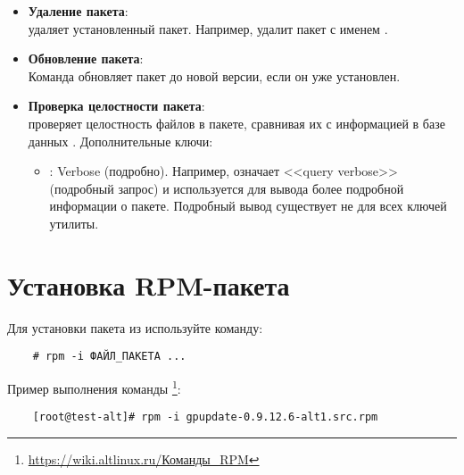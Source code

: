\begin{itemize}
	\item \textbf{Удаление пакета}: \\
	 удаляет установленный пакет. Например,  удалит пакет с именем .
	
	\item \textbf{Обновление пакета}: \\
	Команда  обновляет пакет до новой версии, если он уже установлен.
	
	\item \textbf{Проверка целостности пакета}: \\
	 проверяет целостность файлов в пакете, сравнивая их с информацией в базе данных .
	Дополнительные ключи:
	\begin{itemize}
		\item \textbf{}: Verbose (подробно). Например,  означает <<query verbose>> (подробный запрос) и используется для вывода более подробной информации о пакете. Подробный вывод существует не для всех ключей утилиты.
	\end{itemize}
	
	
\end{itemize}

\section{Установка RPM-пакета}

Для установки пакета из  используйте команду: 
\begin{verbatim}
	# rpm -i ФАЙЛ_ПАКЕТА ...
\end{verbatim}


Пример выполнения команды \footnote{\href{https://wiki.altlinux.ru/\%D0\%9A\%D0\%BE\%D0\%BC\%D0\%B0\%D0\%BD\%D0\%B4\%D1\%8B_RPM}{https://wiki.altlinux.ru/Команды\_RPM}}: 
\begin{verbatim}
	[root@test-alt]# rpm -i gpupdate-0.9.12.6-alt1.src.rpm 
\end{verbatim}

